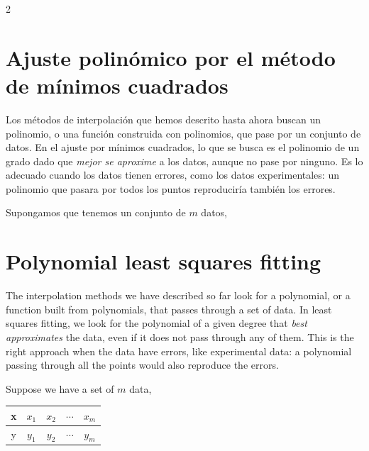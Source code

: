 \begin{paracol}{2}
\section{Ajuste polinómico por el método de mínimos cuadrados}\label{sec:mc} 

Los métodos de interpolación que hemos descrito hasta ahora buscan un polinomio, o una función construida con polinomios, que pase por un conjunto de datos. En el ajuste por mínimos cuadrados, lo que se busca es el polinomio de un grado dado que \emph{mejor se aproxime} a los datos, aunque no pase por ninguno. Es lo adecuado cuando los datos tienen errores, como los datos experimentales: un polinomio que pasara por todos los puntos reproduciría también los errores.

Supongamos que tenemos un conjunto de $m$ datos,
\switchcolumn
\section{Polynomial least squares fitting}\label{sec:mc-2}

The interpolation methods we have described so far look for a polynomial, or a function built from polynomials, that passes through a set of data. In least squares fitting, we look for the polynomial of a given degree that \emph{best approximates} the data, even if it does not pass through any of them. This is the right approach when the data have errors, like experimental data: a polynomial passing through all the points would also reproduce the errors.

Suppose we have a set of $m$ data,
\end{paracol}
\begin{table}[h]
\centering
\begin{tabular}{c|cccc}
x&$x_1$&$x_2$&$\cdots$&$x_m$\\
\hline
y&$y_1$&$y_2$&$\cdots$&$y_m$
\end{tabular}
\end{table}
